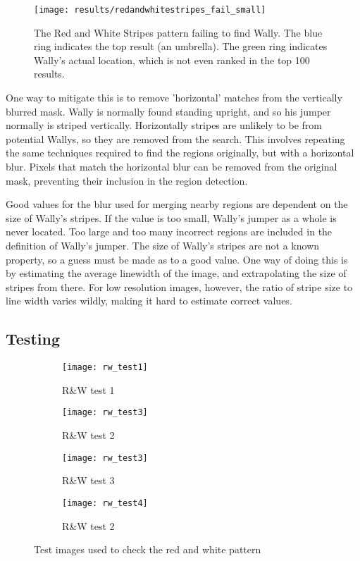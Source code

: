 \documentclass[../main.tex]{subfiles}
\begin{document}
    \begin{figure}[H]
      \centering
      \texttt{[image: results/redandwhitestripes\_fail\_small]}
      \caption{
        The Red and White Stripes pattern failing to find Wally.
        The blue ring indicates the top result (an umbrella).
        The green ring indicates Wally's actual location, which is not even ranked in the top 100 results.
      }
      \label{rws_fail_small}
    \end{figure}

    One way to mitigate this is to remove 'horizontal' matches from the vertically blurred mask.
    Wally is normally found standing upright, and so his jumper normally is striped vertically.
    Horizontally stripes are unlikely to be from potential Wallys, so they are removed from the search.
    This involves repeating the same techniques required to find the regions originally, but with a horizontal blur.
    Pixels that match the horizontal blur can be removed from the original mask, preventing their inclusion in the region detection.

    Good values for the blur used for merging nearby regions are dependent on the size of Wally's stripes.
    If the value is too small, Wally's jumper as a whole is never located.
    Too large and too many incorrect regions are included in the definition of Wally's jumper.
    The size of Wally's stripes are not a known property, so a guess must be made as to a good value.
    One way of doing this is by estimating the average linewidth of the image, and extrapolating the size of stripes from there.
    For low resolution images, however, the ratio of stripe size to line width varies wildly, making it hard to estimate correct values.
    
  \subsection{Testing}
    \begin{figure}[H]
      \centering
      \begin{subfigure}[B]{0.4\textwidth}
        \centering
        \texttt{[image: rw\_test1]} 
        \caption{R\&W test 1}
      \end{subfigure}
      \begin{subfigure}[B]{0.4\textwidth}
        \centering
        \texttt{[image: rw\_test3]} 
        \caption{R\&W test 2}
      \end{subfigure}
      \begin{subfigure}[B]{0.4\textwidth}
        \centering
        \texttt{[image: rw\_test3]} 
        \caption{R\&W test 3}
      \end{subfigure}
      \begin{subfigure}[B]{0.4\textwidth}
        \centering
        \texttt{[image: rw\_test4]} 
        \caption{R\&W test 2}
      \end{subfigure}
      \caption{Test images used to check the red and white pattern}
    \end{figure}
\end{document}
